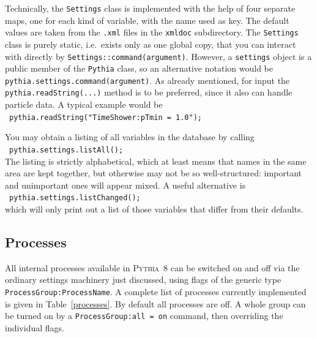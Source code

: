 \documentclass{elsartmod}
\newcommand{\cindent}{\hspace*{10mm}~}
\begin{document}
Technically, the \texttt{Settings} class is implemented with the help 
of four separate maps, one for each kind of variable, with the name
used as key. The default values are taken from the \texttt{.xml}
files in the \texttt{xmldoc} subdirectory. The \texttt{Settings} class 
is purely static, i.e.\ exists only as one global copy, that you can 
interact with directly by \texttt{Settings::command(argument)}. 
However, a \texttt{settings} object is a public member of the 
\texttt{Pythia} class, so an alternative notation would be 
\texttt{pythia.settings.command(argument)}. As already mentioned, 
for input the \texttt{pythia.readString(...)} method is to be preferred, 
since it also can handle particle data. A typical example would be\\
\cindent\texttt{pythia.readString("TimeShower:pTmin = 1.0");}

You may obtain a listing of all variables in the database by calling\\
\cindent \texttt{pythia.settings.listAll();}\\
The listing is strictly alphabetical, which at least means that names
in the same area are kept together, but otherwise may not be so 
well-structured: important and unimportant ones will appear mixed.
A useful alternative is\\
\cindent \texttt{pythia.settings.listChanged();}\\
which will only print out a list of 
those variables that differ from their defaults.

\subsection{Processes}

All internal processes available in \textsc{Pythia}~8 
can be switched on and off via the ordinary settings machinery 
just discussed, using flags of the generic type
\texttt{ProcessGroup:ProcessName}. A complete list of processes
currently implemented is given in Table~\ref{processes}.  By
default all processes are off. A whole group can be turned on by a
\texttt{ProcessGroup:all = on} command, then overriding the individual
flags.
\end{document}
